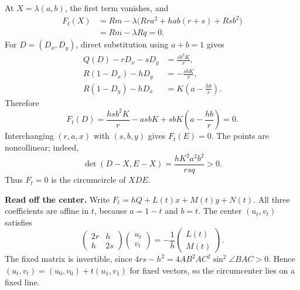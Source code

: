 \documentclass[12pt]{memoir}
\begin{document}
\begin{Ej}
At \(X=\lambda(a,b)\), the first term vanishes, and
\[
\begin{split}
    F_t(X)
    &=Rm-\lambda\bigl(Rra^2+hab(r+s)+Rsb^2\bigr)\\
    &=Rm-\lambda Rq=0.
\end{split}
\]
For \(D=(D_x,D_y)\), direct substitution using \(a+b=1\) gives
\[
\begin{aligned}
    Q(D)-rD_x-sD_y&=\frac{sb^2K}{r},\\
    R(1-D_x)-hD_y&=-\frac{sbK}{r},\\
    R(1-D_y)-hD_x&=K\left(a-\frac{hb}{r}\right).
\end{aligned}
\]
Therefore
\[
    F_t(D)=\frac{hsb^2K}{r}-asbK
        +sbK\left(a-\frac{hb}{r}\right)=0.
\]
Interchanging \((r,a,x)\) with \((s,b,y)\) gives \(F_t(E)=0\).
The points are noncollinear; indeed,
\[
    \det(D-X,E-X)=\frac{hK^2a^2b^2}{rsq}>0.
\]
Thus \(F_t=0\) is the circumcircle of \(XDE\).

\textbf{Read off the center.}
Write \(F_t=hQ+L(t)x+M(t)y+N(t)\). All three coefficients are
affine in \(t\), because \(a=1-t\) and \(b=t\). The center
\((u_t,v_t)\) satisfies
\[
    \begin{pmatrix}2r&h\\h&2s\end{pmatrix}
    \begin{pmatrix}u_t\\v_t\end{pmatrix}
    =-\frac1h\begin{pmatrix}L(t)\\M(t)\end{pmatrix}.
\]
The fixed matrix is invertible, since
\(4rs-h^2=4AB^2AC^2\sin^2\angle BAC>0\).
Hence \((u_t,v_t)=(u_0,v_0)+t(u_1,v_1)\) for fixed vectors,
so the circumcenter lies on a fixed line.
\end{Ej}
\end{document}
